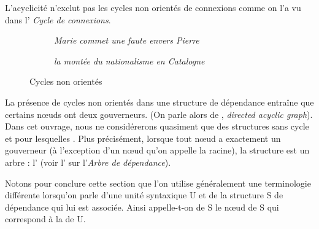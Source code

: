 L’acyclicité n’exclut pas les cycles non orientés de connexions comme on l’a vu dans l’ \textit{Cycle de connexions}.

\begin{figure}
\begin{subfigure}[b]{.5\textwidth}\centering
{}
\caption{\textit{Marie commet une faute envers Pierre}}
\end{subfigure}%
\begin{subfigure}[b]{.5\textwidth}\centering
{}
\caption{\textit{la montée du nationalisme en Catalogne}}
\end{subfigure}
\caption{Cycles non orientés}
\end{figure}

La présence de cycles non orientés dans une structure de dépendance entraîne que certains nœuds ont deux gouverneurs. (On parle alors de , \textit{directed acyclic graph}). Dans cet ouvrage, nous ne considérerons quasiment que des structures sans cycle et pour lesquelles  . Plus précisément, lorsque tout nœud a exactement un gouverneur (à l’exception d’un nœud qu’on appelle la racine), la structure est un arbre : l’ (voir l' sur l'\textit{Arbre de dépendance}).

Notons pour conclure cette section que l’on utilise généralement une terminologie différente lorsqu’on parle d’une unité syntaxique U et de la structure S de dépendance qui lui est associée. Ainsi appelle-t-on  de S le nœud de S qui correspond à la  de U.

